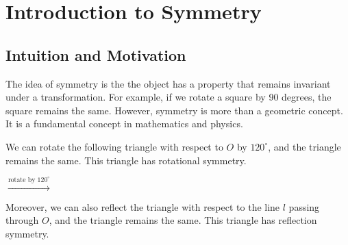 \chapter{Introduction to Symmetry}

\section{Intuition and Motivation}

The idea of symmetry is the the object has a property that remains invariant under a transformation. For example, if we rotate a square by 90 degrees, the square remains the same. However, symmetry is more than a geometric concept. It is a fundamental concept in mathematics and physics.

\begin{example}[Polygons]
    We can rotate the following triangle with respect to $O$ by $120^{\circ}$, and the triangle remains the same. This triangle has rotational symmetry. 

    \begin{center}
        \hfil$\xrightarrow{\text{rotate by } 120^{\circ}}$\hfil
    \end{center}

    Moreover, we can also reflect the triangle with respect to the line $l$ passing through $O$, and the triangle remains the same. This triangle has reflection symmetry.


\end{example}
